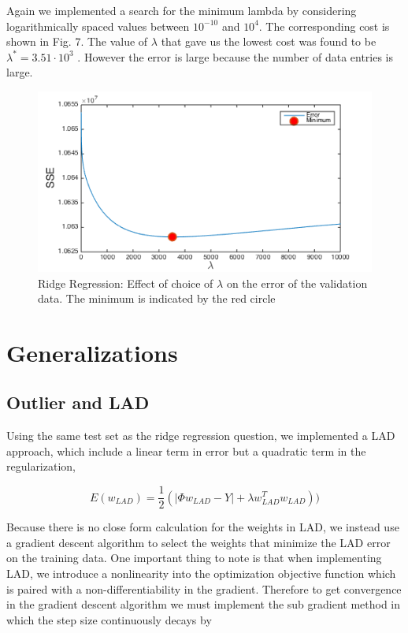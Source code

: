 \documentclass[10pt,twocolumn]{article}
\begin{document}
Again we implemented a search for the minimum lambda by considering logarithmically spaced values between $10^{-10}$ and $10^4$. The corresponding cost is shown in Fig. 7. The value of $\lambda $ that gave us the lowest cost was found to be $\lambda ^* = 3.51 \cdot 10^3 $ . However the error is large because the number of data entries is large.

\begin{figure}[H]
\center
\includegraphics[scale =.4]{3_3.png}
\caption{Ridge Regression: Effect of choice of $\lambda$ on the error of the validation data.  The minimum is indicated by the red circle}
\end{figure}

\section{Generalizations}
\subsection*{Outlier and LAD}

Using the same test set as the ridge regression question, we implemented a LAD approach, which include a linear term in error but a quadratic term in the regularization, 

\begin{equation}
E(w_{LAD}) = \frac{1}{2}(|\Phi w_{LAD}  -Y| + \lambda w_{LAD}^T w_{LAD}))
\end{equation}


Because there is no close form calculation for the weights in LAD, we instead use a gradient descent algorithm to select the weights that minimize the LAD error on the training data. One important thing to note is that when implementing LAD, we introduce a nonlinearity into the optimization objective function which is paired with a non-differentiability in the gradient. Therefore to get convergence in the gradient descent algorithm we must implement the sub gradient method in which the step size continuously decays by 
\end{document}
